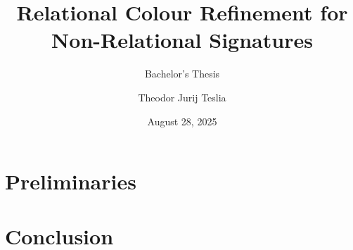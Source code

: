 \documentclass[a4paper,11pt,DIV=15]{scrartcl} %
\theoremstyle{plain}
\theoremstyle{definition}
\begin{document}
\subtitle{Bachelor's Thesis}
\date{August 28, 2025}
\publishers{RWTH Aachen University}	%

\title{Relational Colour Refinement for Non-Relational Signatures}

\author{Theodor Jurij Teslia}

\maketitle


\begin{abstract}
	\lipsum[1-2]
\end{abstract}

\thispagestyle{empty}

\clearpage





\section{Preliminaries}
\label{sec:Preliminaries}







\section{Conclusion}


\clearpage



\end{document}
